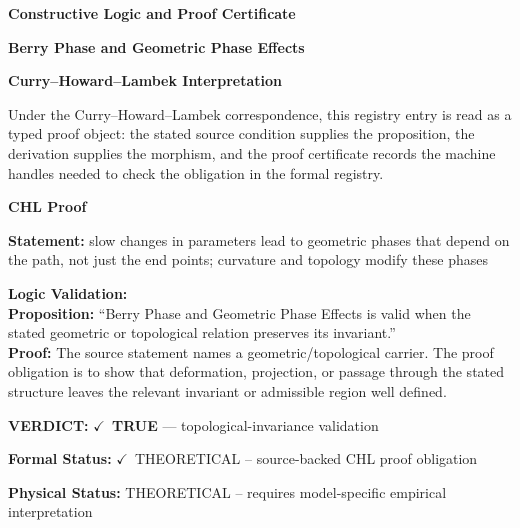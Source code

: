 \clearpage
\begingroup\tzpsupportsetup
\noindent\textbf{\fontsize{10.8pt}{12.8pt}\selectfont [ID 0068] Constructive Logic and Proof Certificate}\par
\noindent\textbf{\fontsize{10pt}{12pt}\selectfont Berry Phase and Geometric Phase Effects}\par
\vspace{0.45em}
\begingroup
\footnotesize
\setlength{\parskip}{0.22em}
\setlength{\parindent}{0pt}
\noindent\textbf{Curry--Howard--Lambek Interpretation}\par
Under the Curry--Howard--Lambek correspondence, this registry entry is read as a typed proof
object: the stated source condition supplies the proposition, the derivation supplies the
morphism, and the proof certificate records the machine handles needed to check the obligation
in the formal registry.

\vspace{0.45em}
\noindent\textbf{CHL Proof}\par
\textbf{Statement:} slow changes in parameters lead to geometric phases that depend on the path, not just
the end points; curvature and topology modify these phases

\textbf{Logic Validation:}\\
\textbf{Proposition:} ``Berry Phase and Geometric Phase Effects is valid when the stated geometric or
topological relation preserves its invariant.''\\
\textbf{Proof:} The source statement names a geometric/topological carrier. The proof obligation is to
show that deformation, projection, or passage through the stated structure leaves the
relevant invariant or admissible region well defined.

\textbf{VERDICT:} \ensuremath{\checkmark}\ \textbf{TRUE} --- topological-invariance validation

\textbf{Formal Status:} \ensuremath{\checkmark}\ THEORETICAL -- source-backed CHL proof obligation

\textbf{Physical Status:} THEORETICAL -- requires model-specific empirical interpretation
\par\vspace{0.45em}
\par
\ifTZPDarkEdition
{}
\fi
\endgroup
\endgroup
